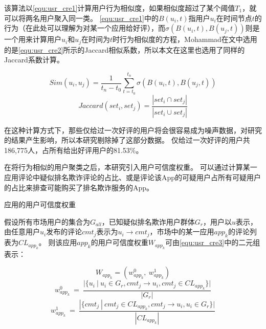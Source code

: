 该算法以\autoref{equ:usr_cre1}计算用户行为相似度，如果相似度超过了某个阈值$T_1$，就可以将两名用户聚入同一类。
\autoref{equ:usr_cre1}中的$B(u_i, t)$指用户$u_i$在时间节点$t$的行为（在此处可以理解为对某一个应用给好评），而$\sigma(B(u_i, t), B(u_j, t))$则是一个用来计算用户$u_i$和$u_j$在时间为$t$时行为相似度的方程，Mohammad在文中选用的是\autoref{equ:usr_cre2}所示的Jaccard相似系数，所以本文在这里也选用了同样的Jaccard系数计算。

\begin{equation}
Sim(u_i, u_j) = \frac{1}{t_n - t_0}\sum_{t=t_0}^{t_n}\sigma(B(u_i, t), B(u_j, t))
\label{equ:usr_cre1}
\end{equation}
\begin{equation}
Jaccard(set_i, set_j) = \frac{|set_i \cap set_j|}{|set_i \cup set_j|}
\label{equ:usr_cre2}
\end{equation}
\vspace{0.5mm}

在这种计算方式下，那些仅给过一次好评的用户将会很容易成为噪声数据，对研究的结果产生影响，所以本研究剔除掉了这部分数据。
仅给过一次好评的用户共186,775人，占所有给出好评用户的81.53\%。

在将行为相似的用户聚类之后，本研究引入用户可信度权重。
可以通过计算某一应用评论中疑似排名欺诈评论的占比、或是评论该App的可疑用户占所有可疑用户的占比来排查可能购买了排名欺诈服务的App。

\begin{Def}
	应用的用户可信度权重

	假设所有市场用户的集合为$G_{all}$，已知疑似排名欺诈用户群体$G_r$，用户以$u$表示，由任意用户$u_i$发布的评论$cmt_j$表示为$u_i \rightarrow cmt_j$，市场中的某一应用$app_k$的评论列表为$CL_{app_k}$。
	则该应用$app_k$的用户可信度权重$W_{app_k}$可由\autoref{equ:usr_cre3}中的二元组表示：
\end{Def}

\begin{equation}
	W_{app_k} = (w_{app_k}^0, ~w_{app_k}^1)
	\label{equ:usr_cre3}
\end{equation}
\begin{equation}
	w_{app_k}^0 ~ = ~ \frac{|\{u_i~|~u_i \in G_r, cmt_j \rightarrow u_i, cmt_j \in CL_{app_k}\}|}{|G_r|}
	\label{equ:usr_cre4}
\end{equation}
\begin{equation}
	w_{app_k}^1 ~ = ~ \frac{|\{cmt_j~|~cmt_j \in CL_{app_k}, cmt_j \rightarrow u_i, u_i \in G_r\}|}{|CL_{app_k}|}
	\label{equ:usr_cre5}
\end{equation}
\vspace{0.5mm}

